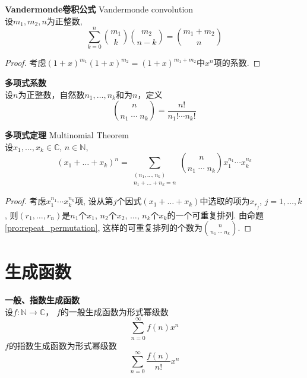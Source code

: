 \begin{pro}\textbf{Vandermonde卷积公式} Vandermonde convolution\\
设$m_1,m_2,n$为正整数, 
\begin{equation}
    \sum_{k=0}^n \binom{m_1}{k} \binom{m_2}{n-k} = \binom{m_1+m_2}{n}
\end{equation}
\end{pro}
\begin{proof}
考虑$(1+x)^{m_1}(1+x)^{m_2}=(1+x)^{m_1+m_2}$中$x^n$项的系数. 
\end{proof}

\begin{dfn} \textbf{多项式系数}\\
设$n$为正整数，自然数$n_1,\dots,n_k$和为$n$，定义
\begin{equation}
    \binom{n}{n_1\;\cdots\;n_k}=\frac{n!}{n_1!\cdots n_k!}
\end{equation}
\end{dfn}

\begin{thm}\textbf{多项式定理} Multinomial Theorem\\
设$x_1,\dots,x_k \in \mathbb{C}$, $n\in \mathbb{N}$, 
\begin{equation}
    (x_1+\dots+x_k)^n = \sum_{\substack{(n_1,\dots,n_k)\\n_1+\dots +n_k=n}} \binom{n}{n_1\;\cdots\;n_k} x_1^{n_1}\cdots x_k^{n_k}
\end{equation}
\label{thm:multinomial}
\end{thm}
\begin{proof}
考虑$x_1^{n_1}\cdots x_k^{n_k}$项, 设从第$j$个因式$(x_1+\dots+x_k)$中选取的项为$x_{r_j}$, $j=1,\dots,k$, 则$(r_1,\dots,r_n)$是$n_1$个$x_1$, $n_2$个$x_2$, $\dots$, $n_k$个$x_k$的一个可重复排列. 由命题\ref{pro:repeat_permutation}, 这样的可重复排列的个数为$\binom{n}{n_1\;\cdots\;n_k}$. 
\end{proof}

\section{生成函数}

\begin{dfn} \textbf{一般、指数生成函数}\\
设$f: \mathbb{N} \to \mathbb{C}$， $f$的一般生成函数为形式幂级数
\begin{equation*}
    \sum_{n=0}^\infty f(n)x^n
\end{equation*}
$f$的指数生成函数为形式幂级数
\begin{equation*}
    \sum_{n=0}^\infty \frac{f(n)}{n!}x^n
\end{equation*}
\end{dfn}

